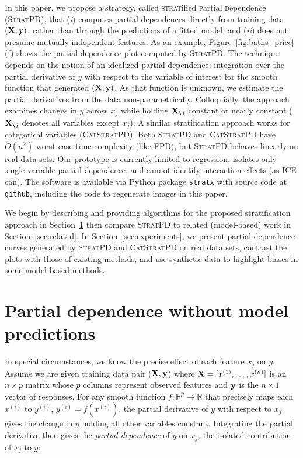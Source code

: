 \documentclass{article}
\newcommand{\secref}[1]{Section~\ref{#1}}
\newcommand{\figref}[1]{Figure~\ref{#1}}
\newcommand{\spd}{\fontfamily{cmr}\textsc{\small StratPD}}
\newcommand{\cspd}{\fontfamily{cmr}\textsc{\small CatStratPD}}
\newcommand{\xnj}{${\bf X}_{\texttt{\char`\\}j}$}
\renewcommand{\xi}{x^{(i)}}
\begin{document}
In this paper, we propose a strategy, called {\textsc{strat}ified \textsc{p}artial \textsc{d}ependence} (\spd{}), that ({\it i}) computes partial dependences directly from training data $({\bf X}, {\bf y})$, rather than through the predictions of a fitted model, and ({\it ii}) does not presume mutually-independent features.  As an example, \figref{fig:baths_price}(f) shows the partial dependence plot computed by \spd. The technique depends on the notion of an idealized partial dependence:  integration over the partial derivative of $y$ with respect to the variable of interest for the smooth function that generated $({\bf X}, {\bf y})$. As that function is unknown, we estimate the partial derivatives from the data non-parametrically.  Colloquially, the approach examines changes in $y$ across $x_j$ while holding \xnj{} constant or nearly constant (\xnj{} denotes all variables except $x_j$). A similar stratification approach works for categorical variables (\cspd). Both \spd{} and \cspd{} have $O(n^2)$ worst-case time complexity (like FPD), but \spd{} behaves linearly on real data sets.  Our prototype is currently limited to regression, isolates only single-variable partial dependence, and cannot identify interaction effects (as ICE can).  The software is available via Python package {\tt stratx} with source code at {\tt github}, including the code to regenerate images in this paper.

We begin by describing and providing algorithms for the proposed stratification approach in \secref{sec:stratpd} then compare \spd{} to related (model-based) work in \secref{sec:related}. In \secref{sec:experiments}, we present partial dependence curves generated by \spd{} and \cspd{} on real data sets, contrast the plots with those of existing methods, and use synthetic data to highlight biases in some model-based methods.

\section{Partial dependence without model predictions}\label{sec:stratpd}

In special circumstances, we know the precise effect of each feature $x_j$ on $y$.  Assume we are given training data pair ($\bf X, y$) where ${\bf X} = [x^{(1)}, \ldots, x^{(n)}]$ is an $n \times p$ matrix whose $p$ columns represent observed features and ${\bf y}$ is the $n \times 1$ vector of responses. For any smooth function $f:\mathbb{R}^{p} \rightarrow \mathbb{R}$ that precisely maps each $\xi$ to $y^{(i)}$, ${y^{(i)}} = f(\xi)$, the partial derivative of $y$ with respect to $x_j$ gives the change in $y$ holding all other variables constant.  Integrating the partial derivative then gives the {\em partial dependence}  of $y$ on $x_j$, the isolated contribution of $x_j$ to $y$:
\end{document}
